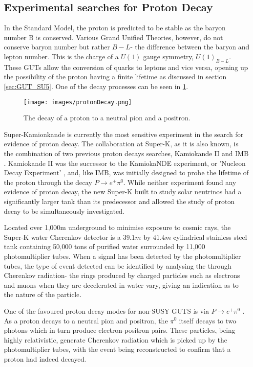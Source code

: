 \documentclass{article}
\begin{document}
\subsection{Experimental searches for Proton Decay}%
\label{sec:GUTExp_PD}
In the Standard Model, the proton is predicted to be stable as the baryon number B is conserved. Various Grand Unified Theories, however, do not conserve baryon number but rather $B-L$- the difference between the baryon and lepton number. This is the charge of a $U(1)$ gauge symmetry, $U(1)_{B-L}$. These GUTs allow the conversion of quarks to leptons and vice versa, opening up the possibility of the proton having a finite lifetime as discussed in section \ref{sec:GUT_SU5}. One of the decay processes can be seen in \ref{fig:protonDecay}.

\begin{figure}
    \centering
    \label{fig:protonDecay}
    \texttt{[image: images/protonDecay.png]}
    \caption{The decay of a proton to a neutral pion and a positron.}
\end{figure}

Super-Kamionkande is currently the most sensitive experiment in the search for evidence of proton decay. The collaboration at Super-K, as it is also known, is the combination of two previous proton decays searches, Kamiokande II and IMB \cite {IMB}. Kamiokande II was the successor to the KamiokaNDE experiment, or 'Nucleon Decay Experiment' \cite{KamiokaNDE}, and, like IMB, was initially designed to probe the lifetime of the proton through the decay $P\rightarrow e^+ \pi^0$. While neither experiment found any evidence of proton decay, the new Super-K built to study solar neutrinos had a significantly larger tank than its predecessor and allowed the study of proton decay to be simultaneously investigated.

Located over 1,000m underground to minimise exposure to cosmic rays, the Super-K water Cherenkov detector is a $39.1m$ by $41.4m$ cylindrical stainless steel tank containing 50,000 tons of purified water \cite{SuperKSpecs} surrounded by 11,000 photomultiplier tubes. 
When a signal has been detected by the photomultiplier tubes, the type of event detected  can be identified by analysing the through Cherenkov radiation- the rings produced by charged particles such as electrons and muons when they are decelerated in water vary, giving an indication as to the nature of the particle.

One of the favoured proton decay modes for non-SUSY GUTS is via $P\rightarrow e^+ \pi^0$ . As a proton decays to a neutral pion and positron, the $\pi^0$ itself decays to two photons which in turn produce electron-positron pairs. These particles, being highly relativistic, generate Cherenkov radiation which is picked up by the photomultiplier tubes, with the event being reconstructed to confirm that a proton had indeed decayed.
\end{document}

